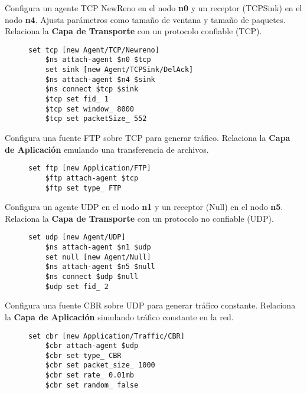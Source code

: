 \noindent Configura un agente TCP NewReno en el nodo \textbf{n0} y un receptor (TCPSink) en el nodo \textbf{n4}.
Ajusta par\'ametros como tamaño de ventana y tamaño de paquetes. Relaciona la \textbf{Capa de Transporte} con un protocolo
confiable (TCP).
\begin{figure}[H]
  \begin{lstlisting}[frame=single, breaklines=true, basicstyle=\footnotesize\ttfamily, breakatwhitespace=false, 
    columns=flexible, tabsize=2, showstringspaces=false]
    set tcp [new Agent/TCP/Newreno]
    $ns attach-agent $n0 $tcp
    set sink [new Agent/TCPSink/DelAck]
    $ns attach-agent $n4 $sink
    $ns connect $tcp $sink
    $tcp set fid_ 1
    $tcp set window_ 8000
    $tcp set packetSize_ 552
  \end{lstlisting}
\end{figure}

\noindent Configura una fuente FTP sobre TCP para generar tr\'afico. Relaciona la \textbf{Capa de Aplicaci\'on} emulando
una transferencia de archivos.
\begin{figure}[H]
  \begin{lstlisting}[frame=single, breaklines=true, basicstyle=\footnotesize\ttfamily, breakatwhitespace=false, 
    columns=flexible, tabsize=2, showstringspaces=false]
    set ftp [new Application/FTP]
    $ftp attach-agent $tcp
    $ftp set type_ FTP
  \end{lstlisting}
\end{figure}

\noindent Configura un agente UDP en el nodo \textbf{n1} y un receptor (Null) en el nodo \textbf{n5}.
Relaciona la \textbf{Capa de Transporte} con un protocolo no confiable (UDP).
\begin{figure}[H]
  \begin{lstlisting}[frame=single, breaklines=true, basicstyle=\footnotesize\ttfamily, breakatwhitespace=false, 
    columns=flexible, tabsize=2, showstringspaces=false]
    set udp [new Agent/UDP]
    $ns attach-agent $n1 $udp
    set null [new Agent/Null]
    $ns attach-agent $n5 $null
    $ns connect $udp $null
    $udp set fid_ 2
  \end{lstlisting}
\end{figure}

\noindent Configura una fuente CBR sobre UDP para generar tr\'afico constante. Relaciona la \textbf{Capa de Aplicaci\'on} simulando
tr\'afico constante en la red.
\begin{figure}[H]
  \begin{lstlisting}[frame=single, breaklines=true, basicstyle=\footnotesize\ttfamily, breakatwhitespace=false, 
    columns=flexible, tabsize=2, showstringspaces=false]
    set cbr [new Application/Traffic/CBR]
    $cbr attach-agent $udp
    $cbr set type_ CBR
    $cbr set packet_size_ 1000
    $cbr set rate_ 0.01mb
    $cbr set random_ false
  \end{lstlisting}
\end{figure}

